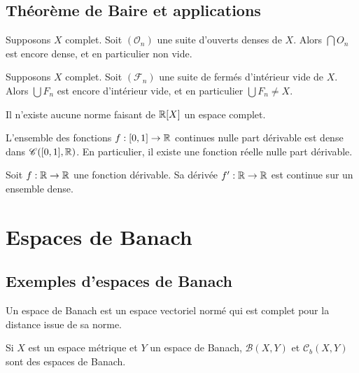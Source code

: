 \documentclass[twocolumn, landscape]{article}
\begin{document}
\pagebreak

\subsection{Théorème de Baire et applications \cite{GouAna}}

\begin{theo}[Baire]
    Supposons $X$ complet. Soit $(\mathscr{O}_n)$ une suite d'ouverts denses de $X$. Alors $\bigcap O_n$ est encore dense, et en particulier non vide.
\end{theo}

\begin{coro}
    Supposons $X$ complet. Soit $(\mathscr{F}_n)$ une suite de fermés d'intérieur vide de $X$. Alors $\bigcup F_n$ est encore d'intérieur vide, et en particulier $\bigcup F_n \neq X$.
\end{coro}

\begin{appl}
    Il n'existe aucune norme faisant de $\mathbb{R}[X]$ un espace complet.
\end{appl}

\begin{appl}
    L'ensemble des fonctions $f: [0, 1] \to \mathbb{R}$ continues nulle part dérivable est dense dans $\mathscr{C}([0, 1], \mathbb{R})$. En particulier, il existe une fonction réelle nulle part dérivable.
\end{appl}

\begin{appl}
    Soit $f : \mathbb{R} \to \mathbb{R}$ une fonction dérivable. Sa dérivée $f' : \mathbb{R} \to \mathbb{R}$ est continue sur un ensemble dense.
\end{appl}

\section{Espaces de Banach}

\subsection{Exemples d'espaces de Banach}

\begin{defi}
    Un espace de Banach est un espace vectoriel normé qui est complet pour la distance issue de sa norme.
\end{defi}

\begin{exem}
    Si $X$ est un espace métrique et $Y$ un espace de Banach, $\mathscr{B}(X,Y)$ et $\mathscr{C}_b(X,Y)$ sont des espaces de Banach.
\end{exem}
\end{document}

